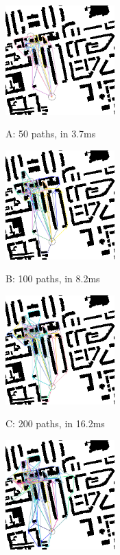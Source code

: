 \documentclass[letterpaper, 10 pt, journal, twoside]{IEEEtran}
\begin{document}
\begin{figure}[t] \scriptsize
\begin{minipage}{.48\linewidth}
  \centerline{\includegraphics[width=4.2cm, cframe=gray .2mm]{50_RJ.png}}
  \centerline{A: 50 paths, in 3.7ms}
\end{minipage}
\hfill
\begin{minipage}{.48\linewidth}
  \centerline{\includegraphics[width=4.2cm, cframe=gray 0.1mm]{100_RJ.png}}
  \centerline{B: 100 paths, in 8.2ms}
\end{minipage}
\vfill
\begin{minipage}{.48\linewidth}
  \centerline{\includegraphics[width=4.2cm, cframe=gray 0.1mm]{200_RJ.png}}
  \centerline{C: 200 paths, in 16.2ms}
\end{minipage}
\hfill
\begin{minipage}{.48\linewidth}
  \centerline{\includegraphics[width=4.2cm, cframe=gray 0.1mm]{400_RJ.png}}

\end{minipage}
\end{figure}
\end{document}
